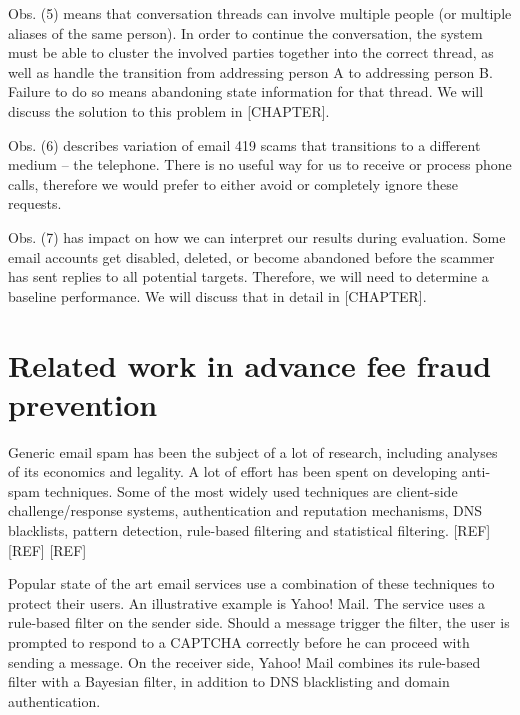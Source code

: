 Obs. (5) means that conversation threads can involve multiple people (or multiple aliases of the same person). In order to continue the conversation, the system must be able to cluster the involved parties together into the correct thread, as well as handle the transition from addressing person A to addressing person B. Failure to do so means abandoning state information for that thread. We will discuss the solution to this problem in [CHAPTER].

Obs. (6) describes variation of email 419 scams that transitions to a different medium – the telephone. There is no useful way for us to receive or process phone calls, therefore we would prefer to either avoid or completely ignore these requests.

Obs. (7) has impact on how we can interpret our results during evaluation. Some email accounts get disabled, deleted, or become abandoned before the scammer has sent replies to all potential targets. Therefore, we will need to determine a baseline performance. We will discuss that in detail in [CHAPTER].

\section{Related work in advance fee fraud prevention}
Generic email spam has been the subject of a lot of research, including analyses of its economics and legality. A lot of effort has been spent on developing anti-spam techniques. Some of the most widely used techniques are client-side challenge/response systems, authentication and reputation mechanisms, DNS blacklists, pattern detection, rule-based filtering and statistical filtering. [REF] [REF] [REF]

Popular state of the art email services use a combination of these techniques to protect their users. An illustrative example is Yahoo! Mail. The service uses a rule-based filter on the sender side. Should a message trigger the filter, the user is prompted to respond to a CAPTCHA correctly before he can proceed with sending a message. On the receiver side, Yahoo! Mail combines its rule-based filter with a Bayesian filter, in addition to DNS blacklisting and domain authentication. 

